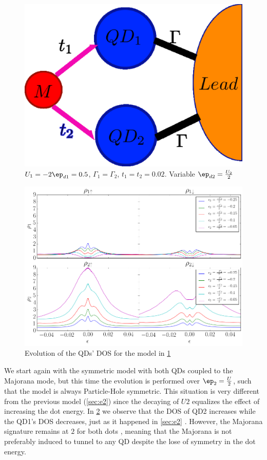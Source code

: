\begin{figure}[h]
\centering
\includegraphics[scale=0.2]{Plots/Model/Majorana-2QD.eps}
\caption{\label{fig:Mod/PHS-Shift_e2.png}$U_{1}=-2\ep_{d1}=0.5$, $\Gamma_{1}=\Gamma_{2}$,
$t_{1}=t_2=0.02$. Variable $\ep_{d2} =\frac{U_{2}}{2}$}
\end{figure}
\begin{figure}[hbt]
\centering
\includegraphics[scale=0.38]{Plots/DOS/PHS-Shift_e2.png}
\caption{\label{fig:DOS/PHS-Shift_e2.png} Evolution of the QDs' DOS for the model in \ref{fig:Mod/PHS-Shift_e2.png} }
\end{figure}
We start again with the symmetric model with both QDs coupled to the Majorana mode, but this time the evolution is performed over $\ep_2=\frac{U}{2}$, such that the model is always Particle-Hole symmetric. This situation is very different from the previous model (\ref{sec:e2}) since the decaying of $U2$ 
equalizes the effect of increasing the dot energy. In \ref{fig:DOS/PHS-Shift_e2.png} we observe that the DOS of QD2 increases while the QD1's DOS decreases, just as it happened in \ref{sec:e2} . However, the Majorana signature remains at $2$ for both dots , meaning that the Majorana is not preferably induced to tunnel to any QD despite the lose of symmetry in the dot energy.

